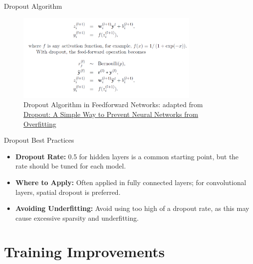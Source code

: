 \documentclass[serif, aspectratio=169]{beamer}
\begin{document}
\begin{frame}{Dropout Algorithm}
    \begin{figure}
                \includegraphics[width=0.8\textwidth]{pic/dropout/algorithm.png}
                \caption{Dropout Algorithm in Feedforward Networks: adapted from \href{https://jmlr.org/papers/v15/srivastava14a.html}{Dropout: A Simple Way to Prevent Neural Networks from Overfitting}}
                \label{fig:Dropout}
            \end{figure}
\end{frame}



\begin{frame}{Dropout Best Practices}
    \begin{itemize}
        \item \textbf{Dropout Rate:} 0.5 for hidden layers is a common starting point, but the rate should be tuned for each model.
        \item \textbf{Where to Apply:} Often applied in fully connected layers; for convolutional layers, spatial dropout is preferred.
        \item \textbf{Avoiding Underfitting:} Avoid using too high of a dropout rate, as this may cause excessive sparsity and underfitting.
    \end{itemize}
\end{frame}




\section{Training Improvements}

\end{document}

